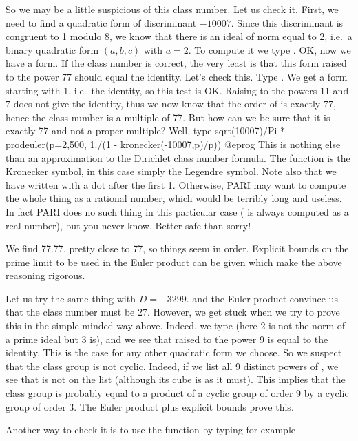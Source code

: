 So we may be a little suspicious of this class number. Let us check it.
First, we need to find a quadratic form of discriminant $-10007$. Since this
discriminant is congruent to 1 modulo 8, we know that there is an ideal of
norm equal to 2, i.e.~a binary quadratic form $(a,b,c)$ with $a=2$. To
compute it we type . OK, now we have a form.
If the class number is correct, the very least is that this form raised to
the power 77 should equal the identity. Let's check this. Type .
We get a form starting with 1, i.e.~the identity, so this test is OK. Raising
 to the powers 11 and 7 does not give the identity, thus we now know
that the order of  is exactly 77, hence the class number is a multiple
of 77. But how can we be sure that it is exactly 77 and not a proper multiple?
Well, type
\bprog
  sqrt(10007)/Pi * prodeuler(p=2,500, 1./(1 - kronecker(-10007,p)/p))
@eprog
%
This is nothing else than an approximation to the Dirichlet class number
formula. The function  is the Kronecker symbol, in this case
simply the Legendre symbol. Note also that we have written 
with a dot after the first 1. Otherwise, PARI may want to compute the whole
thing as a rational number, which would be terribly long and useless. In fact
PARI does no such thing in this particular case ( is always
computed as a real number), but you never know. Better safe than sorry!

We find 77.77, pretty close to 77, so things seem in order. Explicit bounds
on the prime limit to be used in the Euler product can be given which make
the above reasoning rigorous.

Let us try the same thing with $D=-3299$.  and the Euler
product convince us that the class number must be 27. However, we get stuck
when we try to prove this in the simple-minded way above. Indeed, we type
 (here 2 is not the norm of a prime ideal but
3 is), and we see that  raised to the power 9 is equal to the identity.
This is the case for any other quadratic form we choose. So we suspect that the
class group is not cyclic. Indeed, if we list all 9 distinct powers of ,
we see that  is not on the list (although its cube
is as it must). This implies that the class group is probably equal to a
product of a cyclic group of order 9 by a cyclic group of order 3. The Euler
product plus explicit bounds prove this.

Another way to check it is to use the  function by typing
for example


